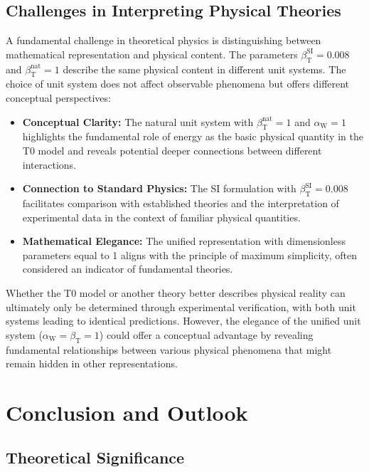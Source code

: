 \documentclass[12pt,a4paper]{article}
\newcommand{\betaT}{\beta_{\text{T}}}
\newcommand{\alphaW}{\alpha_{\text{W}}}
\begin{document}
	\subsection{Challenges in Interpreting Physical Theories}
	
	A fundamental challenge in theoretical physics is distinguishing between mathematical representation and physical content. The parameters \(\betaT^{\text{SI}} = 0.008\) and \(\betaT^{\text{nat}} = 1\) describe the same physical content in different unit systems. The choice of unit system does not affect observable phenomena but offers different conceptual perspectives:
	
	\begin{itemize}
		\item \textbf{Conceptual Clarity:} The natural unit system with \(\betaT^{\text{nat}} = 1\) and \(\alphaW = 1\) highlights the fundamental role of energy as the basic physical quantity in the T0 model and reveals potential deeper connections between different interactions.
		\item \textbf{Connection to Standard Physics:} The SI formulation with \(\betaT^{\text{SI}} = 0.008\) facilitates comparison with established theories and the interpretation of experimental data in the context of familiar physical quantities.
		\item \textbf{Mathematical Elegance:} The unified representation with dimensionless parameters equal to 1 aligns with the principle of maximum simplicity, often considered an indicator of fundamental theories.
	\end{itemize}
	
	Whether the T0 model or another theory better describes physical reality can ultimately only be determined through experimental verification, with both unit systems leading to identical predictions. However, the elegance of the unified unit system (\(\alphaW = \betaT = 1\)) could offer a conceptual advantage by revealing fundamental relationships between various physical phenomena that might remain hidden in other representations.
	
	\section{Conclusion and Outlook}
	
	\subsection{Theoretical Significance}
	
\end{document}
